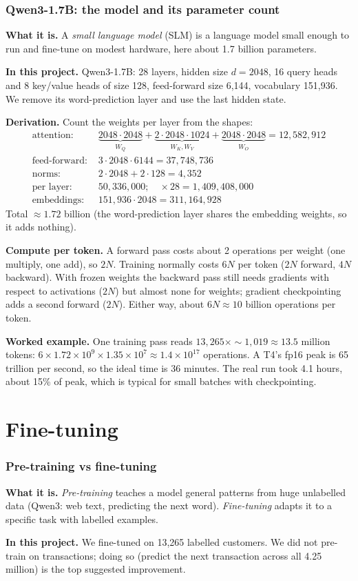 \documentclass[10pt,a4paper]{article}
\newcommand{\what}[1]{\par\textbf{What it is.} #1}
\newcommand{\here}[1]{\par\textbf{In this project.} #1}
\newcommand{\deriv}{\par\textbf{Derivation.} }
\newcommand{\ex}{\par\textbf{Worked example.} }
\begin{document}
\section{Qwen3-1.7B: the model and its parameter count}
\what{A \emph{small language model} (SLM) is a language model small enough to run and fine-tune on modest hardware, here about 1.7 billion parameters.}
\here{Qwen3-1.7B: 28 layers, hidden size $d=2048$, 16 query heads and 8 key/value heads of size 128, feed-forward size 6,144, vocabulary 151,936. We remove its word-prediction layer and use the last hidden state.}
\deriv Count the weights per layer from the shapes:
\begin{align*}
\text{attention: }&\underbrace{2048\cdot2048}_{W_Q}+\underbrace{2\cdot2048\cdot1024}_{W_K,W_V}+\underbrace{2048\cdot2048}_{W_O}=12{,}582{,}912\\
\text{feed-forward: }&3\cdot2048\cdot6144=37{,}748{,}736\\
\text{norms: }&2\cdot2048+2\cdot128=4{,}352\\
\text{per layer: }&50{,}336{,}000;\quad\times28=1{,}409{,}408{,}000\\
\text{embeddings: }&151{,}936\cdot2048=311{,}164{,}928
\end{align*}
Total $\approx1.72$ billion (the word-prediction layer shares the embedding weights, so it adds nothing).

\textbf{Compute per token.} A forward pass costs about 2 operations per weight (one multiply, one add), so $2N$. Training normally costs $6N$ per token ($2N$ forward, $4N$ backward). With frozen weights the backward pass still needs gradients with respect to activations ($2N$) but almost none for weights; gradient checkpointing adds a second forward ($2N$). Either way, about $6N\approx10$ billion operations per token.
\ex One training pass reads $13{,}265\times\sim1{,}019\approx13.5$ million tokens: $6\times1.72\times10^9\times1.35\times10^7\approx1.4\times10^{17}$ operations. A T4's fp16 peak is 65 trillion per second, so the ideal time is 36 minutes. The real run took 4.1 hours, about 15\% of peak, which is typical for small batches with checkpointing.

\part{Fine-tuning}
\section{Pre-training vs fine-tuning}
\what{\emph{Pre-training} teaches a model general patterns from huge unlabelled data (Qwen3: web text, predicting the next word). \emph{Fine-tuning} adapts it to a specific task with labelled examples.}
\here{We fine-tuned on 13,265 labelled customers. We did not pre-train on transactions; doing so (predict the next transaction across all 4.25 million) is the top suggested improvement.}
\end{document}
